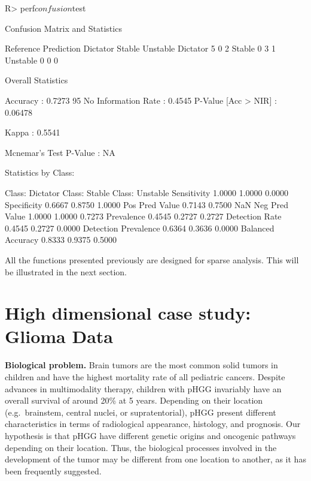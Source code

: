 \documentclass[
]{jss}
\begin{document}
\footnotesize

\begin{CodeChunk}
\begin{CodeInput}
R> perf$confusion$test
\end{CodeInput}
\begin{CodeOutput}
Confusion Matrix and Statistics

          Reference
Prediction Dictator Stable Unstable
  Dictator        5      0        2
  Stable          0      3        1
  Unstable        0      0        0

Overall Statistics
                                          
               Accuracy : 0.7273          
                 95%
    No Information Rate : 0.4545          
    P-Value [Acc > NIR] : 0.06478         
                                          
                  Kappa : 0.5541          
                                          
 Mcnemar's Test P-Value : NA              

Statistics by Class:

                     Class: Dictator Class: Stable Class: Unstable
Sensitivity                   1.0000        1.0000          0.0000
Specificity                   0.6667        0.8750          1.0000
Pos Pred Value                0.7143        0.7500             NaN
Neg Pred Value                1.0000        1.0000          0.7273
Prevalence                    0.4545        0.2727          0.2727
Detection Rate                0.4545        0.2727          0.0000
Detection Prevalence          0.6364        0.3636          0.0000
Balanced Accuracy             0.8333        0.9375          0.5000
\end{CodeOutput}
\end{CodeChunk}

\normalsize

All the functions presented previously are designed for sparse analysis.
This will be illustrated in the next section.

\hypertarget{high-dimensional-case-study-glioma-data}{%
\section{High dimensional case study: Glioma
Data}\label{high-dimensional-case-study-glioma-data}}

\textbf{Biological problem.} Brain tumors are the most common solid
tumors in children and have the highest mortality rate of all pediatric
cancers. Despite advances in multimodality therapy, children with pHGG
invariably have an overall survival of around 20\% at 5 years. Depending
on their location (e.g.~brainstem, central nuclei, or supratentorial),
pHGG present different characteristics in terms of radiological
appearance, histology, and prognosis. Our hypothesis is that pHGG have
different genetic origins and oncogenic pathways depending on their
location. Thus, the biological processes involved in the development of
the tumor may be different from one location to another, as it has been
frequently suggested.
\end{document}
